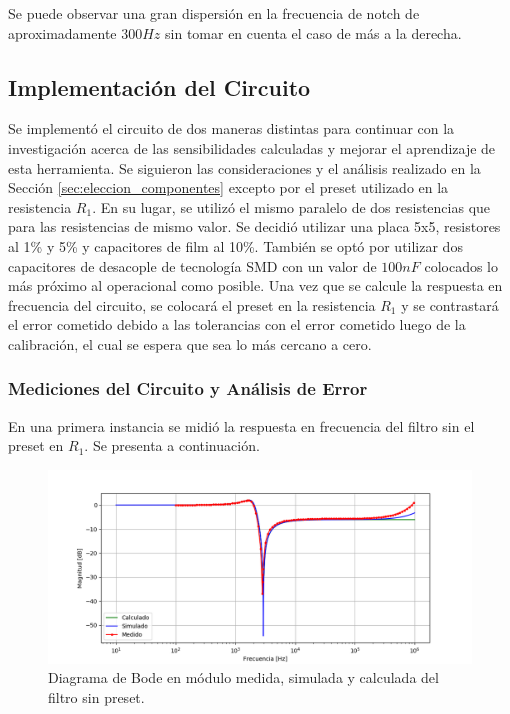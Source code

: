 Se puede observar una gran dispersión en la frecuencia de notch de aproximadamente $300Hz$ sin tomar en cuenta el caso de más a la derecha.

\subsection{Implementación del Circuito}
Se implementó el circuito de dos maneras distintas para continuar con la investigación acerca de las sensibilidades calculadas y mejorar el aprendizaje de esta herramienta. Se siguieron las consideraciones y el análisis realizado en la Sección \ref{sec:eleccion_componentes} excepto por el preset utilizado en la resistencia $R_1$. En su lugar, se utilizó el mismo paralelo de dos resistencias que para las resistencias de mismo valor. Se decidió utilizar una placa 5x5, resistores al 1\% y 5\% y capacitores de film al 10\%. También se optó por utilizar dos capacitores de desacople de tecnología SMD con un valor de $100nF$ colocados lo más próximo al operacional como posible. Una vez que se calcule la respuesta en frecuencia del circuito, se colocará el preset en la resistencia $R_1$ y se contrastará el error cometido debido a las tolerancias con el error cometido luego de la calibración, el cual se espera que sea lo más cercano a cero.
\subsubsection{Mediciones del Circuito y Análisis de Error}
\label{sec:mediciones}

En una primera instancia se midió la respuesta en frecuencia del filtro sin el preset en $R_1$. Se presenta a continuación.

\begin{figure}[H]
	\centering
	\includegraphics[width=\textwidth]{Imagenes/bode_calc_sim_med.PNG}
	\caption{Diagrama de Bode en módulo medida, simulada y calculada del filtro sin preset.}
	\label{fig:bode_calc_sim_med}
\end{figure}

